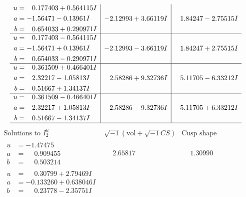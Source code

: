 \documentclass[1p]{elsarticle_modified}
\theoremstyle{definition}
\newcommand{\I}{\sqrt{-1}}
\begin{document}
$$\begin{array}{c|c|c}
\begin{aligned}
u &= \phantom{-}0.177403 + 0.564115 I \\
a &= -1.56471 - 0.13961 I \\
b &= \phantom{-}0.654033 + 0.290971 I\end{aligned}
 & -2.12993 + 3.66119 I & \phantom{-}1.84247 - 2.75515 I \\ \hline\begin{aligned}
u &= \phantom{-}0.177403 - 0.564115 I \\
a &= -1.56471 + 0.13961 I \\
b &= \phantom{-}0.654033 - 0.290971 I\end{aligned}
 & -2.12993 - 3.66119 I & \phantom{-}1.84247 + 2.75515 I \\ \hline\begin{aligned}
u &= \phantom{-}0.361509 + 0.466401 I \\
a &= \phantom{-}2.32217 - 1.05813 I \\
b &= \phantom{-}0.51667 + 1.34137 I\end{aligned}
 & \phantom{-}2.58286 + 9.32736 I & \phantom{-}5.11705 - 6.33212 I \\ \hline\begin{aligned}
u &= \phantom{-}0.361509 - 0.466401 I \\
a &= \phantom{-}2.32217 + 1.05813 I \\
b &= \phantom{-}0.51667 - 1.34137 I\end{aligned}
 & \phantom{-}2.58286 - 9.32736 I & \phantom{-}5.11705 + 6.33212 I\\
 \hline 
 \end{array}$$\newpage$$\begin{array}{c|c|c}  
\text{Solutions to }I^u_{2}& \I (\text{vol} + \sqrt{-1}CS) & \text{Cusp shape}\\
 \hline 
\begin{aligned}
u &= -1.47475\phantom{ +0.000000I} \\
a &= \phantom{-}0.909455\phantom{ +0.000000I} \\
b &= \phantom{-}0.503214\phantom{ +0.000000I}\end{aligned}
 & \phantom{-}2.65817\phantom{ +0.000000I} & \phantom{-}1.30990\phantom{ +0.000000I} \\ \hline\begin{aligned}
u &= \phantom{-}0.30799 + 2.79469 I \\
a &= -0.133260 + 0.638046 I \\
b &= \phantom{-}0.23778 - 2.35751 I\end{aligned}

\end{array}$$
\end{document}
